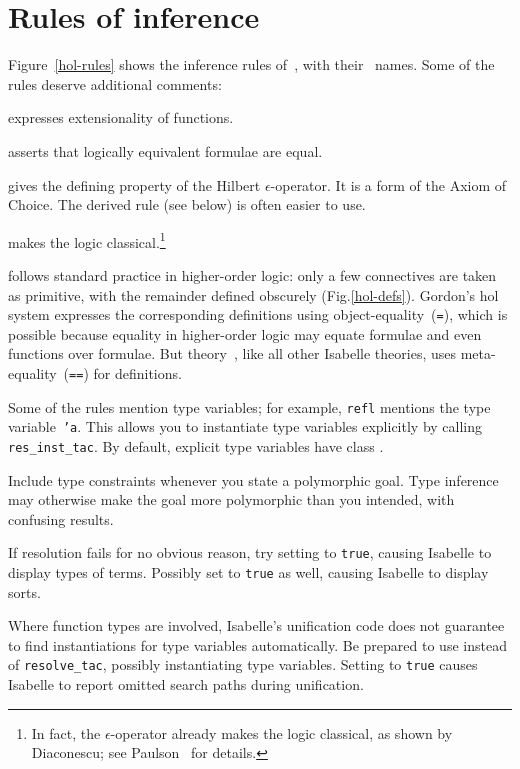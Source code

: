 \section{Rules of inference}
Figure~\ref{hol-rules} shows the inference rules of~\HOL{}, with
their~{\ML} names.  Some of the rules deserve additional comments:
\begin{ttdescription}
\item[\tdx{ext}] expresses extensionality of functions.
\item[\tdx{iff}] asserts that logically equivalent formulae are
  equal.
\item[\tdx{selectI}] gives the defining property of the Hilbert
  $\epsilon$-operator.  It is a form of the Axiom of Choice.  The derived rule
   (see below) is often easier to use.
\item[\tdx{True_or_False}] makes the logic classical.\footnote{In
    fact, the $\epsilon$-operator already makes the logic classical, as
    shown by Diaconescu; see Paulson~\cite{paulson-COLOG} for details.}
\end{ttdescription}

\HOL{} follows standard practice in higher-order logic: only a few
connectives are taken as primitive, with the remainder defined obscurely
(Fig.\ts\ref{hol-defs}).  Gordon's {\sc hol} system expresses the
corresponding definitions \cite[page~270]{mgordon-hol} using
object-equality~({\tt=}), which is possible because equality in
higher-order logic may equate formulae and even functions over formulae.
But theory~\HOL{}, like all other Isabelle theories, uses
meta-equality~({\tt==}) for definitions.

Some of the rules mention type variables; for example, {\tt refl}
mentions the type variable~{\tt'a}.  This allows you to instantiate
type variables explicitly by calling {\tt res_inst_tac}.  By default,
explicit type variables have class .

Include type constraints whenever you state a polymorphic goal.  Type
inference may otherwise make the goal more polymorphic than you intended,
with confusing results.

\begin{warn}
  If resolution fails for no obvious reason, try setting
   to {\tt true}, causing Isabelle to display types of
  terms.  Possibly set  to {\tt true} as well, causing
  Isabelle to display sorts.

  Where function types are involved, Isabelle's unification code does not
  guarantee to find instantiations for type variables automatically.  Be
  prepared to use  instead of {\tt resolve_tac},
  possibly instantiating type variables.  Setting
   to {\tt true} causes Isabelle to report
  omitted search paths during unification.
\end{warn}


